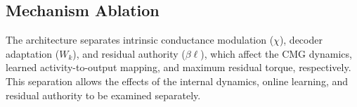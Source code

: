 \documentclass[letterpaper, 10 pt, conference]{ieeeconf}
\begin{document}




\subsection{Mechanism Ablation}
\label{sec:ablation}

The architecture separates intrinsic conductance modulation ($\chi$), decoder adaptation ($W_k$), and residual authority ($\beta\bm\ell$), which affect the CMG dynamics, learned activity-to-output mapping, and maximum residual torque, respectively. This separation allows the effects of the internal dynamics, online learning, and residual authority to be examined separately.
\end{document}
